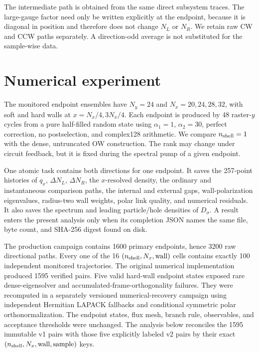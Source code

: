 \documentclass[aps,prb,twocolumn,floatfix,nofootinbib,superscriptaddress]{revtex4-2}
\begin{document}
The intermediate path is obtained from the same direct subsystem traces.
The large-gauge factor need only be written explicitly at the endpoint,
because it is diagonal in position and therefore does not change $N_L$ or
$N_R$.  We retain raw CW and CCW paths separately.  A direction-odd average
is not substituted for the sample-wise data.

\section{Numerical experiment}

The monitored endpoint ensembles have $N_y=24$ and
$N_x=20,24,28,32$, with soft and hard walls at
$x=N_x/4,3N_x/4$.  Each endpoint is produced by 48 raster-$y$ cycles from a
pure half-filled random state using $\alpha_1=1$, $\alpha_2=30$, perfect
correction, no postselection, and complex128 arithmetic.  We compare
$n_{\rm shell}=1$ with the dense, untruncated OW construction.  The rank may
change under circuit feedback, but it is fixed during the spectral pump of a
given endpoint.

One atomic task contains both directions for one endpoint.  It saves the
257-point histories of $q_x$, $\Delta N_L$, $\Delta N_R$, the $x$-resolved
density, the ordinary and instantaneous comparison paths, the internal and
external gaps, wall-polarization eigenvalues, radius-two wall weights, polar
link quality, and numerical residuals.  It also saves the spectrum and
leading particle/hole densities of $D_\sigma$.  A result enters the present
analysis only when its completion JSON names the same file, byte count, and
SHA-256 digest found on disk.

The production campaign contains 1600 primary endpoints, hence 3200 raw
directional paths.  Every one of the 16
$(n_{\rm shell},N_x,{\rm wall})$ cells contains exactly 100 independent
monitored trajectories.  The original numerical implementation produced
1595 verified pairs.  Five valid hard-wall endpoint states exposed rare
dense-eigensolver and accumulated-frame-orthogonality failures.  They were
recomputed in a separately versioned numerical-recovery campaign using
independent Hermitian LAPACK fallbacks and conditional symmetric polar
orthonormalization.  The endpoint states, flux mesh, branch rule, observables,
and acceptance thresholds were unchanged.  The analysis below reconciles
the 1595 immutable v1 pairs with those five explicitly labeled v2 pairs by
their exact $(n_{\rm shell},N_x,{\rm wall},{\rm sample})$ keys.
\end{document}

